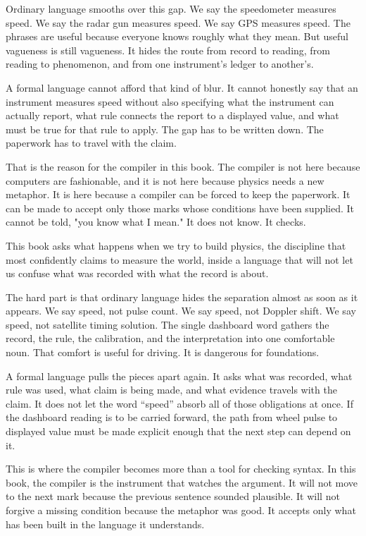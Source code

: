 Ordinary language smooths over this gap. We say the speedometer measures speed.
We say the radar gun measures speed. We say GPS measures speed. The phrases are
useful because everyone knows roughly what they mean. But useful vagueness is
still vagueness. It hides the route from record to reading, from reading to
phenomenon, and from one instrument's ledger to another's.

A formal language cannot afford that kind of blur. It cannot honestly say that
an instrument measures speed without also specifying what the instrument can
actually report, what rule connects the report to a displayed value, and what
must be true for that rule to apply. The gap has to be written down. The
paperwork has to travel with the claim.

That is the reason for the compiler in this book. The compiler is not here
because computers are fashionable, and it is not here because physics needs a
new metaphor. It is here because a compiler can be forced to keep the paperwork.
It can be made to accept only those marks whose conditions have been supplied.
It cannot be told, "you know what I mean." It does not know. It checks.

This book asks what happens when we try to build physics, the discipline that
most confidently claims to measure the world, inside a language that will not
let us confuse what was recorded with what the record is about.

The hard part is that ordinary language hides the separation almost as soon as
it appears. We say speed, not pulse count. We say speed, not Doppler shift. We
say speed, not satellite timing solution. The single dashboard word gathers the
record, the rule, the calibration, and the interpretation into one comfortable
noun. That comfort is useful for driving. It is dangerous for foundations.

A formal language pulls the pieces apart again. It asks what was recorded, what
rule was used, what claim is being made, and what evidence travels with the
claim. It does not let the word ``speed'' absorb all of those obligations at
once. If the dashboard reading is to be carried forward, the path from wheel
pulse to displayed value must be made explicit enough that the next step can
depend on it.

This is where the compiler becomes more than a tool for checking syntax. In
this book, the compiler is the instrument that watches the argument. It will
not move to the next mark because the previous sentence sounded plausible. It
will not forgive a missing condition because the metaphor was good. It accepts
only what has been built in the language it understands.

